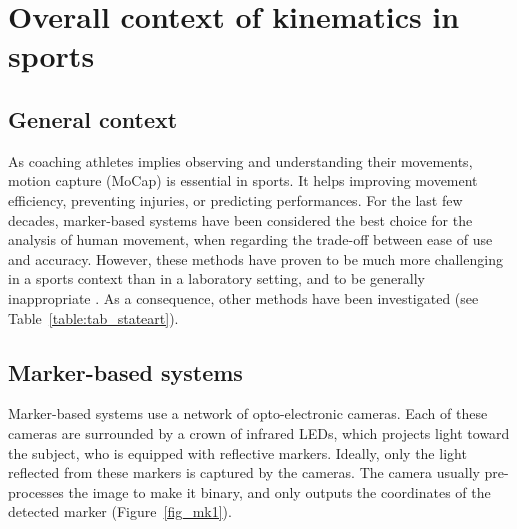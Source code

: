 \minitoc
\newpage



\FloatBarrier
\section{Overall context of kinematics in sports}
\subsection{General context}

As coaching athletes implies observing and understanding their movements, motion capture (MoCap) is essential in sports. It helps improving movement efficiency, preventing injuries, or predicting performances. For the last few decades, marker-based systems have been considered the best choice for the analysis of human movement, when regarding the trade-off between ease of use and accuracy. However, these methods have proven to be much more challenging in a sports context than in a laboratory setting, and to be generally inappropriate \cite{Mündermann2006, Colyer2018}. As a consequence, other methods have been investigated (see Table~\ref{table:tab_stateart}).

\subsection{Marker-based systems}

Marker-based systems use a network of opto-electronic cameras. Each of these cameras are surrounded by a crown of infrared LEDs, which projects light toward the subject, who is equipped with reflective markers. Ideally, only the light reflected from these markers is captured by the cameras. The camera usually pre-processes the image to make it binary, and only outputs the coordinates of the detected marker (Figure~\ref{fig_mk1}). 

